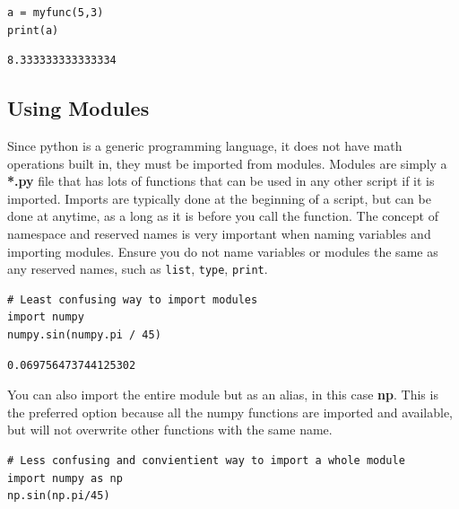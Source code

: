 \documentclass[%
oneside,                 %
final,                   %
10pt]{article}
\begin{document}
\begin{verbatim}
a = myfunc(5,3)
print(a)
\end{verbatim}

\begin{verbatim}
8.333333333333334
\end{verbatim}

\subsection{Using Modules}

Since python is a generic programming language, it does not have math operations built in, they must be imported from modules. Modules are simply a \textbf{*.py} file that has lots of functions that can be used in any other script if it is imported. Imports are typically done at the beginning of a script, but can be done at anytime, as a long as it is before you call the function. The concept of namespace and reserved names is very important when naming variables and importing modules. Ensure you do not name variables or modules the same as any reserved names, such as \texttt{list}, \texttt{type}, \texttt{print}.



\begin{verbatim}
# Least confusing way to import modules
import numpy
numpy.sin(numpy.pi / 45)
\end{verbatim}

\begin{verbatim}
0.069756473744125302
\end{verbatim}

You can also import the entire module but as an alias, in this case \textbf{np}. This is the preferred option because all the numpy functions are imported and available, but will not overwrite other functions with the same name.

\begin{verbatim}
# Less confusing and convientient way to import a whole module
import numpy as np
np.sin(np.pi/45)
\end{verbatim}
\end{document}
